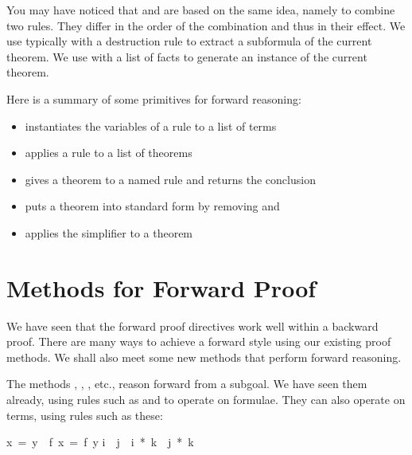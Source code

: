 You may have noticed that  and  are based on 
the same idea, namely to combine two rules.  They differ in the
order of the combination and thus in their effect.  We use 
typically with a destruction rule to extract a subformula of the current
theorem.  We use  with a list of facts to generate an instance of
the current theorem.%

Here is a summary of some primitives for forward reasoning:
\begin{itemize}
\item {} instantiates the variables of a rule to a list of terms
\item {} applies a rule to a list of theorems
\item {} gives a theorem to a named rule and returns the
conclusion 
\item {} puts a theorem into standard form
  by removing \isa{\isasymlongrightarrow} and~\isa{\isasymforall}
\item {} applies the simplifier to a theorem
\end{itemize}


\section{Methods for Forward Proof}

We have seen that the forward proof directives work well within a backward 
proof.  There are many ways to achieve a forward style using our existing
proof methods.  We shall also meet some new methods that perform forward
reasoning.  

The methods , , , etc.,
reason forward from a subgoal.  We have seen them already, using rules such as
 and
 to operate on formulae.  They can also operate on terms, using rules
such as these:
\begin{isabelle}
x\ =\ y\ \isasymLongrightarrow \ f\ x\ =\ f\ y%
\isanewline
i\ \isasymle \ j\ \isasymLongrightarrow \ i\ *\ k\ \isasymle \ j\ *\ k%
\end{isabelle}

